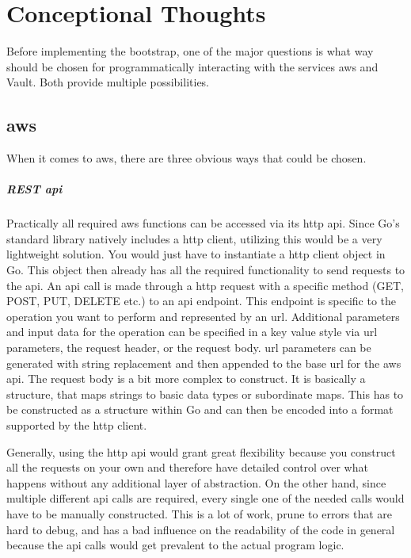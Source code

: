 \chapter{Conceptional Thoughts}
Before implementing the bootstrap, one of the major questions is what way should be chosen for programmatically interacting with the services \ac{aws} and Vault.
Both provide multiple possibilities.

\section{\ac{aws}}
When it comes to \ac{aws}, there are three obvious ways that could be chosen.

\paragraph{REST \ac{api}}
Practically all required \ac{aws} functions can be accessed via its \ac{http} \ac{api}.
Since Go's standard library natively includes a \ac{http} client, utilizing this would be a very lightweight solution.
You would just have to instantiate a \ac{http} client object in Go.
This object then already has all the required functionality to send requests to the \ac{api}.
An \ac{api} call is made through a \ac{http} request with a specific method (GET, POST, PUT, DELETE etc.) to an \ac{api} endpoint.
This endpoint is specific to the operation you want to perform and represented by an \ac{url}.
Additional parameters and input data for the operation can be specified in a key value style via \ac{url} parameters, the request header, or the request body.
\ac{url} parameters can be generated with string replacement and then appended to the base \ac{url} for the \ac{aws} \ac{api}.
The request body is a bit more complex to construct.
It is basically a structure, that maps strings to basic data types or subordinate maps.
This has to be constructed as a structure within Go and can then be encoded into a format supported by the \ac{http} client.

Generally, using the \ac{http} \ac{api} would grant great flexibility because you construct all the requests on your own and therefore have detailed control over what happens without any additional layer of abstraction.
On the other hand, since multiple different \ac{api} calls are required, every single one of the needed calls would have to be manually constructed.
This is a lot of work, prune to errors that are hard to debug, and has a bad influence on the readability of the code in general because the \ac{api} calls would get prevalent to the actual program logic.


